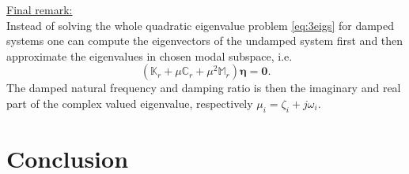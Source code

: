 \documentclass[conference]{journal}
\newcommand{\bb}[1]{\mathbb{#1}}
\newcommand{\B}[1]{\mathbf{#1}}
\newcommand{\Beta}{\boldsymbol{\eta}}
\begin{document}
	\underline{Final remark:}\\ Instead of solving the whole quadratic eigenvalue problem \eqref{eq:3eigs} for damped systems one can compute the eigenvectors of the undamped system first and then approximate the eigenvalues in chosen modal subspace, i.e.
	\begin{equation}
	(\bb{K}_r + \mu \bb{C}_r + \mu^2 \bb{M}_r) \Beta = \B{0}.
	\end{equation}  
	The damped natural frequency and damping ratio is then the imaginary and real part of the complex valued eigenvalue, respectively $\mu_i = \zeta_i + j \omega_i$.
	\section{Conclusion}
	
	
	
\end{document}
